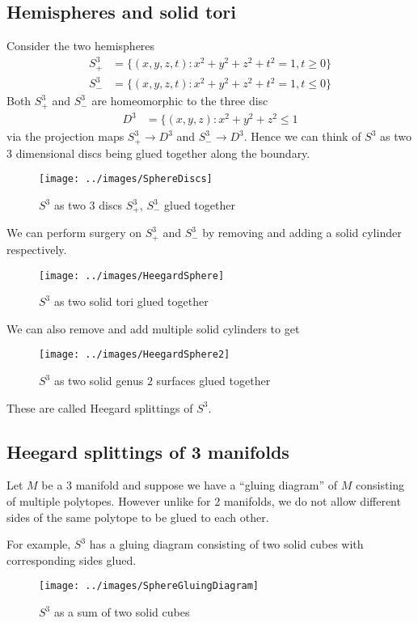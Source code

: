 \subsection{Hemispheres and solid tori}
Consider the two hemispheres
\begin{align*}
	S^3_+ & = \{ (x,y,z,t) : x^2 + y^2 + z ^{2} + t ^{2} = 1 , t \ge 0 \} \\
	S^3_- & = \{ (x,y,z,t) : x^2 + y^2 + z ^{2} + t ^{2} = 1 , t \le 0 \}
\end{align*}
Both $S^3_+$ and $S^3_-$ are homeomorphic to the three disc
\begin{align*}
	D^3 & = \{ (x,y,z) : x^2 + y^2 + z ^{2} \le 1
\end{align*}
via the projection maps $S^3_+ \rightarrow D^3$ and $S^3_- \rightarrow D^3$. Hence we can think of $S^3$ as two 3 dimensional discs being glued together along the boundary.

\begin{figure}[H]
	\centering
	\texttt{[image: ../images/SphereDiscs]}
	\caption{$S^3$ as two 3 discs $S^3_+$, $S^3_-$ glued together}
\end{figure}

We can perform surgery on $S^3_+$ and $S^3_-$ by removing and adding a solid cylinder respectively.
\begin{figure}[H]
	\centering
	\texttt{[image: ../images/HeegardSphere]}
	\caption{$S^3$ as two solid tori glued together}
\end{figure}

We can also remove and add multiple solid cylinders to get
\begin{figure}[H]
	\centering
	\texttt{[image: ../images/HeegardSphere2]}
	\caption{$S^3$ as two solid genus $2$ surfaces glued together}
\end{figure}

These are called Heegard splittings of $S^3$.

\subsection{Heegard splittings of 3 manifolds}
Let $M$ be a 3 manifold and suppose we have a ``gluing diagram'' of $M$ consisting of multiple polytopes. However unlike for 2 manifolds, we do not allow different sides of the same polytope to be glued to each other.

For example, $S^3$ has a gluing diagram consisting of two solid cubes with corresponding sides glued.
\begin{figure}[H]
	\centering
	\texttt{[image: ../images/SphereGluingDiagram]}
	\caption{$S^3$ as a sum of two solid cubes}
\end{figure}


